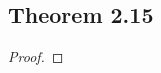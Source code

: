 \documentclass[../../main.tex]{subfiles}
\begin{document}
\subsection{Theorem 2.15}
\begin{wts}

\end{wts}
\begin{proof}

\end{proof}
\end{document}
